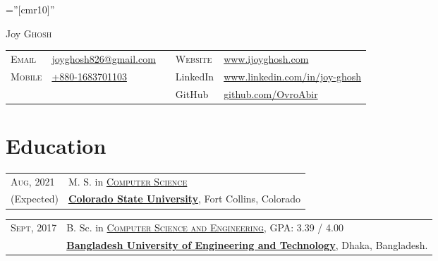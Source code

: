\documentclass[a4paper,10pt]{article}
\begin{document}
\vspace{-\baselineskip}
\pagestyle{empty} %

\font\fb=''[cmr10]'' %

\par{\centering
    {\Huge Joy \textsc{Ghosh}
  }\bigskip\par}

\begin{tabular}{p{1.5cm}p{4cm}p{5cm}p{1.5cm}p{5cm}}
     \textsc{Email} & \href{mailto:joyghosh826@gmail.com}{joyghosh826@gmail.com}
     & & 
     \textsc{Website} & \href{www.ijoyghosh.com}{www.ijoyghosh.com} \\
     \textsc{Mobile} & \href{tel:8801683701103}{+880-1683701103} & & LinkedIn & \href{https://www.linkedin.com/in/joy-ghosh}{www.linkedin.com/in/joy-ghosh} \\
     & & & GitHub & \href{https://github.com/OvroAbir}{github.com/OvroAbir}
\end{tabular}


\section{Education}
\begin{tabular}{p{1.8cm}|l} 

  \textsc{Aug}, 2021 & M. S. in \href{https://compsci.colostate.edu}{\textsc{Computer Science}} \\
 (Expected) & \href{https://www.colostate.edu/}{\textbf{Colorado State University}}, Fort Collins, Colorado

\end{tabular}

\begin{tabular}{p{1.8cm}|l}
 \textsc{Sept}, 2017 & B. Sc. in \href{https://cse.buet.ac.bd/}{\textsc{Computer Science and Engineering}}, \normalsize \textsc{GPA}: 3.39 / 4.00 \\
 & \href{http://www.buet.ac.bd/}{\textbf{Bangladesh University of Engineering and Technology}}, Dhaka, Bangladesh.

\end{tabular}
\end{document}
